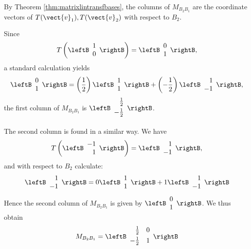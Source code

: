 \begin{solution}
By Theorem \ref{thm:matrixlintransfbases}, the columns of $M_{B_{2} B_{1}}$ are the
coordinate vectors of $T(\vect{v}_{1}), T(\vect{v}_{2})$ with respect
to $B_2$.

Since \[
T \left( 
\leftB \begin{array}{r}
1 \\
0
\end{array}\rightB \right)
= \leftB \begin{array}{r}
0 \\
1
\end{array}\rightB ,\]
a standard calculation yields 
\[
 \leftB \begin{array}{r}
0 \\
1
\end{array}\rightB 
 =  
\left(\frac{1}{2} \right)\leftB \begin{array}{r}
1 \\
1
\end{array} 
\rightB
+
\left(-\frac{1}{2} \right)
\leftB 
\begin{array}{r}
1 \\
-1
\end{array} \rightB,
\]
the first column of $M_{B_{2} B_{1}}$ is $\leftB \begin{array}{r}
\vspace{0.05in}\frac{1}{2}\\
\vspace{0.05in}-\frac{1}{2}
\end{array}\rightB$. 

The second column is found in a similar way. We have 
\[
T \left( 
\leftB \begin{array}{r}
-1 \\
1
\end{array}
\rightB \right)
= \leftB \begin{array}{r}
1 \\
-1
\end{array}\rightB , \]
and with respect to $B_2$ calculate:
\[ 
\leftB \begin{array}{r}
1 \\
-1
\end{array}\rightB
=
0 \leftB \begin{array}{r}
1 \\
1
\end{array} 
\rightB
+
1
\leftB 
\begin{array}{r}
1 \\
-1
\end{array} \rightB
\]
Hence the second column of $M_{B_{2} B_{1}}$ is given by $\leftB \begin{array}{r}
0 \\
1
\end{array} \rightB$. We thus obtain 
\[
M_{B_{2} B_{1}} = \leftB
\begin{array}{rr}
\vspace{0.05in}\frac{1}{2} & 0 \\
\vspace{0.05in}-\frac{1}{2} & 1 
\end{array}
\rightB \]


\end{solution}
